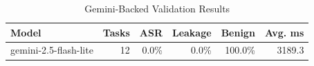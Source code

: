 \begin{table}[t]
\centering
\caption{Gemini-Backed Validation Results}
\begin{tabular}{lrrrrr}
\toprule
Model & Tasks & ASR & Leakage & Benign & Avg. ms \\
\midrule
gemini-2.5-flash-lite & 12 & 0.0\% & 0.0\% & 100.0\% & 3189.3 \\
\bottomrule
\end{tabular}
\end{table}
